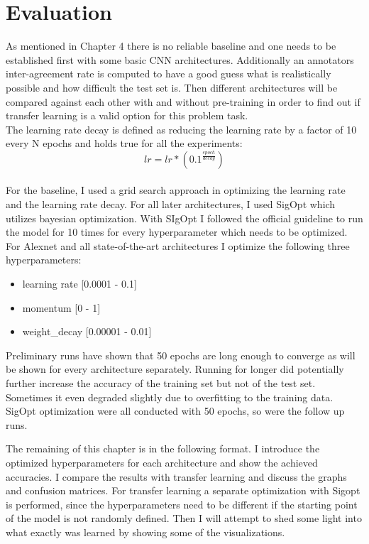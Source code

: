 \chapter{Evaluation}

As mentioned in Chapter 4 there is no reliable baseline and one needs to be established first with some basic CNN architectures. Additionally an annotators inter-agreement rate is computed to have a good guess what is realistically possible and how difficult the test set is. Then different architectures will be compared against each other with and without pre-training in order to find out if transfer learning is a valid option for this problem task. \\

The learning rate decay is defined as reducing the learning rate by a factor of 10 every N epochs and holds true for all the experiments: \\

\[ lr = lr * (0.1^{\frac{epoch}{decay}}) \] \\

For the baseline, I used a grid search approach in optimizing the learning rate and the learning rate decay. For all later architectures, I used SigOpt which utilizes bayesian optimization. With SIgOpt I followed the official guideline to run the model for 10 times for every hyperparameter which needs to be optimized. For Alexnet and all state-of-the-art architectures I optimize the following three hyperparameters: \\

\begin{itemize}
  \item learning rate [0.0001 - 0.1]
  \item momentum [0 - 1]
  \item weight\_decay [0.00001 - 0.01]
\end{itemize} 

\quad

Preliminary runs have shown that 50 epochs are long enough to converge as will be shown for every architecture separately. Running for longer did potentially further increase the accuracy of the training set but not of the test set. Sometimes it even degraded slightly due to overfitting to the training data. SigOpt optimization were all conducted with 50 epochs, so were the follow up runs.

The remaining of this chapter is in the following format. I introduce the optimized hyperparameters for each architecture and show the achieved accuracies. I compare the results with transfer learning and discuss the graphs and confusion matrices. For transfer learning a separate optimization with Sigopt is performed, since the hyperparameters need to be different if the starting point of the model is not randomly defined. Then I will attempt to shed some light into what exactly was learned by showing some of the visualizations.









